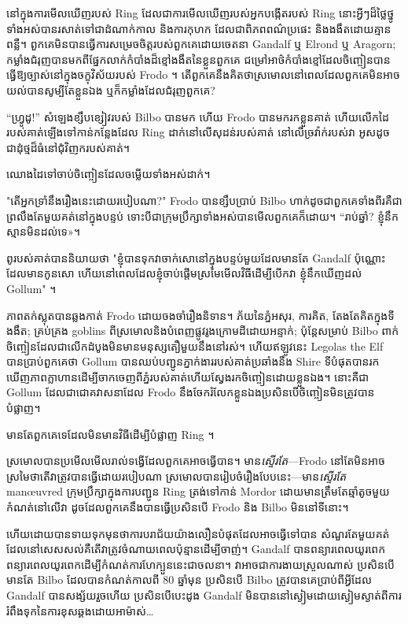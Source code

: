 នៅក្នុងការមើលឃើញរបស់ Ring ដែលជាការមើលឃើញរបស់អ្នកបង្កើតរបស់ Ring នោះអ្វីៗដ៏ថ្លៃថ្នូទាំងអស់បានរសាត់ទៅជាដំណាក់កាល និងការកុហក ដែលជាពិភពពណ៌ប្រផេះ និងងងឹតដោយគ្មានពន្លឺ។ ពួកគេមិនបានធ្វើការសម្រេចចិត្តរបស់ពួកគេដោយចេតនា Gandalf ឬ Elrond ឬ Aragorn; កម្លាំងជំរុញបានមកពីផ្នែកលាក់កំបាំងដ៏ខ្មៅងងឹតនៃខ្លួនពួកគេ ជម្រៅអាថ៌កំបាំងខ្មៅដែលចិញ្ចៀនបានធ្វើឱ្យច្បាស់នៅក្នុងចក្ខុវិស័យរបស់ Frodo ។ តើ​ពួក​គេ​នឹង​គិត​ថា​ស្រមោល​នៅ​ពេល​ដែល​ពួក​គេ​មិន​អាច​យល់​បាន​សូម្បី​តែ​ខ្លួន​ឯង ឬ​ក៏​កម្លាំង​ដែល​ជំរុញ​ពួក​គេ?

“ហ្វ្រូដូ!” សំឡេងខ្សឹបខ្សៀវរបស់ Bilbo បានមក ហើយ Frodo បានមករកខ្លួនគាត់ ហើយលើកដៃរបស់គាត់ឡើងទៅកាន់កន្លែងដែល Ring ដាក់នៅលើសុដន់របស់គាត់ នៅលើច្រវ៉ាក់របស់វា អូសដូចជាដុំថ្មដ៏ធំនៅជុំវិញករបស់គាត់។

ឈោងដៃទៅចាប់ចិញ្ចៀនដែលចម្លើយទាំងអស់ដាក់។

"តើអ្នកទ្រាំនឹងរឿងនេះដោយរបៀបណា?" Frodo បានខ្សឹបប្រាប់ Bilbo ហាក់ដូចជាពួកគេទាំងពីរគឺជាព្រលឹងតែមួយគត់នៅក្នុងបន្ទប់ ទោះបីជាក្រុមប្រឹក្សាទាំងអស់បានមើលពួកគេក៏ដោយ។ “រាប់ឆ្នាំ? ខ្ញុំ​នឹក​ស្មាន​មិន​ដល់​ទេ»។

ពូរបស់គាត់បាននិយាយថា "ខ្ញុំបានទុកវាចាក់សោនៅក្នុងបន្ទប់មួយដែលមានតែ Gandalf ប៉ុណ្ណោះដែលមានកូនសោ ហើយនៅពេលដែលខ្ញុំចាប់ផ្តើមស្រមៃមើលវិធីដើម្បីបើកវា ខ្ញុំនឹកឃើញដល់ Gollum" ។

ភាពតក់ស្លុតបានឆ្លងកាត់ Frodo ដោយចងចាំរឿងនិទាន។ ភ័យ​នៃ​ភ្នំ​អសុរ, ការ​គិត, តែង​តែ​គិត​ក្នុង​ទី​ងងឹត; គ្រប់គ្រង goblins ពីស្រមោលនិងបំពេញផ្លូវរូងក្រោមដីដោយអន្ទាក់; ប៉ុន្តែសម្រាប់ Bilbo ពាក់ចិញ្ចៀនដែលជាលើកដំបូងមិនមានមនុស្សតឿមួយនឹងនៅរស់។ ហើយឥឡូវនេះ Legolas the Elf បានប្រាប់ពួកគេថា Gollum បានឈប់បញ្ជូនភ្នាក់ងាររបស់គាត់ប្រឆាំងនឹង Shire ទីបំផុតបានរកឃើញភាពក្លាហានដើម្បីចាកចេញពីភ្នំរបស់គាត់ហើយស្វែងរកចិញ្ចៀនដោយខ្លួនឯង។ នោះគឺជា Gollum ដែលជាជោគវាសនាដែល Frodo នឹងចែករំលែកខ្លួនឯងប្រសិនបើចិញ្ចៀនមិនត្រូវបានបំផ្លាញ។

មានតែពួកគេទេដែលមិនមានវិធីដើម្បីបំផ្លាញ Ring ។

ស្រមោល​បាន​ប្រមើល​មើល​រាល់​ទង្វើ​ដែល​ពួកគេ​អាច​ធ្វើ​បាន។ មាន\emph{ស្ទើរតែ}—Frodo នៅតែមិនអាចស្រមៃថាតើវាត្រូវបានធ្វើដោយរបៀបណា ស្រមោលបានរៀបចំរឿងបែបនេះ—មាន\emph{ស្ទើរតែ} manœuvred ក្រុមប្រឹក្សាក្នុងការបញ្ជូន Ring ត្រង់ទៅកាន់ Mordor ដោយមានត្រឹមតែឆ្មាំតូចមួយ កំណត់នៅលើវា ដូចដែលពួកគេនឹងបានធ្វើប្រសិនបើ Frodo និង Bilbo មិននៅទីនោះ។

ហើយ​ដោយ​បាន​ទាយ​ទុក​មុន​ថា​ការ​បរាជ័យ​យ៉ាង​លឿន​បំផុត​ដែល​អាច​ធ្វើ​ទៅ​បាន សំណួរ​តែ​មួយ​គត់​ដែល​នៅ​សេសសល់​គឺ​តើ​វា​ត្រូវ​ចំណាយ​ពេល​ប៉ុន្មាន​ដើម្បី​ចាញ់។ Gandalf បានពន្យារពេលយូរពេក ពន្យារពេលយូរពេកដើម្បីកំណត់ការហែក្បួននេះជាចលនា។ វាអាចជាការងាយស្រួលណាស់ ប្រសិនបើមានតែ Bilbo ដែលបានកំណត់កាលពី 80 ឆ្នាំមុន ប្រសិនបើ Bilbo ត្រូវបានគេប្រាប់ពីអ្វីដែល Gandalf បានសង្ស័យរួចហើយ ប្រសិនបើបេះដូង Gandalf មិនបាននៅស្ងៀមដោយស្ងៀមស្ងាត់ពីការរំពឹងទុកនៃការខុសឆ្គងដោយអាម៉ាស់…

